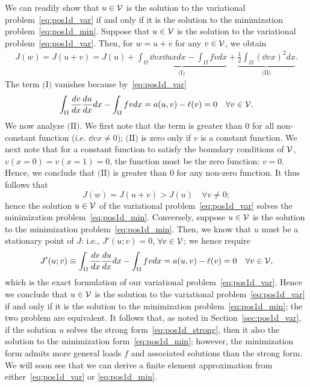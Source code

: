 We can readily show that $u \in \mathcal{V}$ is the solution to the variational problem~\eqref{eq:pos1d_var} if and only if it is the solution to the minimization problem~\eqref{eq:pos1d_min}.  Suppose that $u \in \mathcal{V}$ is the solution to the variational problem~\eqref{eq:pos1d_var}.  Then, for $w = u + v$ for any $v \in \mathcal{V}$, we obtain
\begin{align*}
   J(w) = J(u + v) = J(u) + \underbrace{ \int_{\Omega} \dd{v}{x} \dd{u}{x} dx - \int_\Omega f v dx}_{\text{(I)}}
  + \underbrace{ \frac{1}{2} \int_{\Omega} \left( \dd{v}{x} \right)^2 dx }_{\text{(II)}}. %
\end{align*}
The term $\text{(I)}$ vanishes because by~\eqref{eq:pos1d_var}
\begin{equation*}
  \int_{\Omega} \frac{d v}{d x} \frac{d u}{d x} dx - \int_\Omega f v dx
  = a(u,v) - \ell(v) = 0 \quad \forall v \in \mathcal{V}.
\end{equation*}
We now analyze $\text{(II)}$.  We first note that the term is greater than $0$ for all non-constant function (i.e. $\dd{v}{x} \neq 0$); $\text{(II)}$ is zero only if $v$ is a constant function.  We next note that for a constant function to satisfy the boundary conditions of $\mathcal{V}$,  $v(x=0) = v(x=1) = 0$, the function must be the zero function: $ v= 0$. Hence, we conclude that $\text{(II)}$ is greater than $0$ for any non-zero function.  It thus follows that
\begin{equation*}
  J(w) = J(u+v)  > J(u) \quad \forall v \neq 0;
\end{equation*}
hence the solution $u \in \mathcal{V}$ of the variational problem~\eqref{eq:pos1d_var} solves the minimization problem~\eqref{eq:pos1d_min}. 
Conversely, suppose $u \in \mathcal{V}$ is the solution to the minimization problem~\eqref{eq:pos1d_min}.  Then, we know that $u$ must be a stationary point of $J$: i.e., $J'(u;v) = 0$, $\forall v \in \mathcal{V}$; we hence require
\begin{equation*}
  J'(u;v) \equiv
  \int_{\Omega} \frac{d v}{d x} \frac{d u}{d x} dx
  - \int_{\Omega} f v dx
  = a(u,v) - \ell(v) = 0 \quad \forall v \in \mathcal{V},
\end{equation*}
which is the exact formulation of our variational problem~\eqref{eq:pos1d_var}. Hence we conclude that $u \in \mathcal{V}$ is the solution to the variational problem~\eqref{eq:pos1d_var} if and only if it is the solution to the minimization problem~\eqref{eq:pos1d_min}; the two problem are equivalent.  It follows that, as noted in  Section~\ref{sec:pos1d_var}, if the solution $u$ solves the strong form~\eqref{eq:pos1d_strong}, then it also the solution to the minimization form~\eqref{eq:pos1d_min}; however, the minimization form admits more general loads $f$ and associated solutions than the strong form. We will soon see that we can derive a finite element approximation from either~\eqref{eq:pos1d_var} or \eqref{eq:pos1d_min}.

